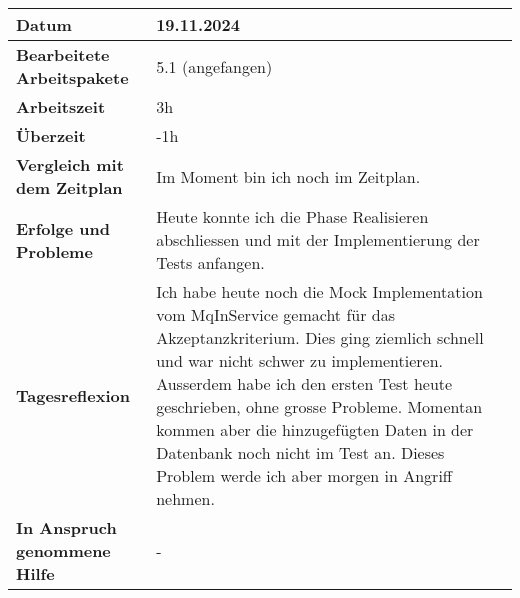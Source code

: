 \begin{longtable}{p{}|p{}}
	\hline
	\textbf{Datum}                       & 19.11.2024            \\
	\hline
	\textbf{Bearbeitete Arbeitspakete}   & 5.1 (angefangen)                  \\
	\hline
	\textbf{Arbeitszeit}                 & 3h                                    \\
	\hline
	\textbf{Überzeit}                    & -1h                                    \\
	\hline
	\textbf{Vergleich mit dem Zeitplan}  & Im Moment bin ich noch im Zeitplan. \\
	\hline
	\textbf{Erfolge und Probleme} & Heute konnte ich die Phase Realisieren abschliessen und mit der Implementierung der Tests anfangen. 
	\\
	\hline
	\textbf{Tagesreflexion} & Ich habe heute noch die Mock Implementation vom MqInService gemacht für das Akzeptanzkriterium. Dies ging ziemlich schnell und war nicht schwer zu implementieren. Ausserdem habe ich den ersten Test heute geschrieben, ohne grosse Probleme. Momentan kommen aber die hinzugefügten Daten in der Datenbank noch nicht im Test an. Dieses Problem werde ich aber morgen in Angriff nehmen. 
	\\
	\hline
	\textbf{In Anspruch genommene Hilfe} & -                              \\
	\hline
\end{longtable}\label{tab:arbeitsprotokoll-19.11.2024}
\newpage


